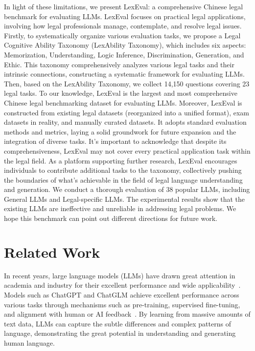In light of these limitations, we present LexEval: a comprehensive Chinese legal benchmark for evaluating LLMs. LexEval focuses on practical legal applications, involving how legal professionals manage, contemplate, and resolve legal issues.
Firstly, to systematically organize various evaluation tasks, we propose a Legal Cognitive Ability Taxonomy (LexAbility Taxonomy), which includes six aspects: Memorization, Understanding, Logic Inference, Discrimination, Generation, and Ethic. 
This taxonomy comprehensively analyzes various legal tasks and their intrinsic connections, constructing a systematic framework for evaluating LLMs.
Then, based on the LexAbility Taxonomy, we collect 14,150 questions covering 23 legal tasks.
To our knowledge, LexEval is the largest and most comprehensive Chinese legal benchmarking dataset for evaluating LLMs.
Moreover, LexEval is constructed from existing legal datasets (reorganized into a unified format), exam datasets in reality, and manually curated datasets. It adopts standard evaluation methods and metrics, laying a solid groundwork for future expansion and the integration of diverse tasks.
It's important to acknowledge that despite its comprehensiveness, LexEval may not cover every practical application task within the legal field.  As a platform supporting further research, LexEval encourages individuals to contribute additional tasks to the taxonomy, collectively pushing the boundaries of what's achievable in the field of legal language understanding and generation.
We conduct a thorough evaluation of 38 popular LLMs, including General LLMs and Legal-specific LLMs. The experimental results show that the existing LLMs are ineffective and unreliable in addressing legal problems. We hope this benchmark can point out different directions for future work.

\section{Related Work}

In recent years, large language models (LLMs) have drawn great attention in academia and industry for their excellent performance and wide applicability~\cite{openai2023gpt4,zeng2022glm,JTR}.
Models such as ChatGPT and ChatGLM achieve excellent performance across various tasks through mechanisms such as pre-training, supervised fine-tuning, and alignment with human or AI feedback~\cite{bai2022training,christiano2017deep,dong,dong2}.
By learning from massive amounts of text data, LLMs can capture the subtle differences and complex patterns of language, demonstrating the great potential in understanding and generating human language.

